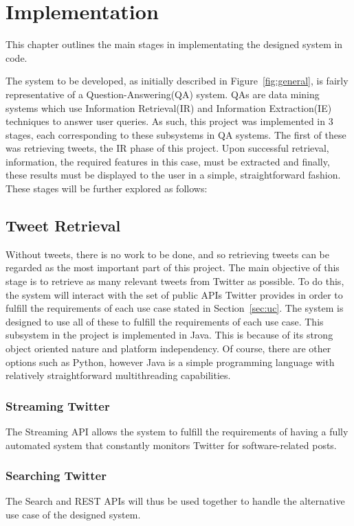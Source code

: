 \chapter{Implementation}
\label{cha:impl}
This chapter outlines the main stages in implementating the designed system in code.


The system to be developed, as initially described in Figure~\ref{fig:general}, is fairly representative of a Question-Answering(QA) system. QAs are data mining systems which use Information Retrieval(IR) and Information Extraction(IE) techniques to answer user queries. As such, this project was implemented in 3 stages, each corresponding to these subsystems in QA systems. The first of these was retrieving tweets, the IR phase of this project. Upon successful retrieval, information, the required features in this case, must be extracted and finally, these results must be displayed to the user in a simple, straightforward fashion. These stages will be further explored as follows:

\section{Tweet Retrieval}
Without tweets, there is no work to be done, and so retrieving tweets can be regarded as the most important part of this project. The main objective of this stage is to retrieve as many relevant tweets from Twitter as possible. To do this, the system will interact with the set of public APIs Twitter provides in order to fulfill the requirements of each use case stated in Section~\ref{sec:uc}. The system is designed to use all of these to fulfill the requirements of each use case. This subsystem in the project is implemented in Java. This is because of its strong object oriented nature and platform independency. Of course, there are other options such as Python, however Java is a simple programming language with relatively straightforward multithreading capabilities.

\subsection{Streaming Twitter}
The Streaming API allows the system to fulfill the requirements of having a fully automated system that constantly monitors Twitter for software-related posts.

\subsection{Searching Twitter}
The Search and REST APIs will thus be used together to handle the alternative use case of the designed system.



